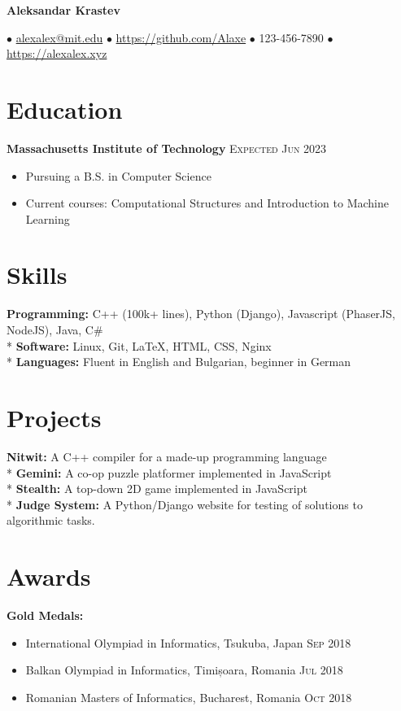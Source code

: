 \documentclass[letterpaper,11pt]{article}
\author{Aleksandar Krastev}
\date{2019-09-03}
\newcommand{\noskip}{\vspace{-\parskip}}
\begin{document}
\centerline{{\Huge \bf Aleksandar Krastev}}
$\bullet$ \href{mailto:alexalex@mit.edu}{alexalex@mit.edu} \hfill
$\bullet$ \href{https://github.com/Alaxe}{https://github.com/Alaxe} \hfill
$\bullet$ 123-456-7890 \hfill
$\bullet$ \href{https://alexalex.xyz}{https://alexalex.xyz}

\noskip
\section*{Education}
\textbf{Massachusetts Institute of Technology}
\hfill
\textsc{Expected Jun 2023}

\noskip
\begin{itemize}
    \item Pursuing a B.S. in Computer Science
    \item Current courses: Computational Structures and Introduction to Machine
        Learning
\end{itemize}

\section*{Skills}
\textbf{Programming:} C++ (100k+ lines), Python (Django), Javascript
    (PhaserJS, NodeJS), Java, C\#\\*
\textbf{Software:} Linux, Git, LaTeX, HTML, CSS, Nginx\\*
\textbf{Languages:} Fluent in English and Bulgarian, beginner in German

\section*{Projects}
\textbf{Nitwit:} A C++ compiler for a made-up programming language\\*
\textbf{Gemini:} A co-op puzzle platformer implemented in JavaScript\\*
\textbf{Stealth:} A top-down 2D game implemented in JavaScript\\*
\textbf{Judge System:} A Python/Django website for testing of solutions
to algorithmic tasks.

\section*{Awards}
\textbf{Gold Medals:}
\noskip
\begin{itemize}
    \item International Olympiad in Informatics, Tsukuba, Japan
        \hfill \textsc{Sep 2018}
    \item Balkan Olympiad in Informatics, Timișoara, Romania
        \hfill \textsc{Jul 2018}
    \item Romanian Masters of Informatics, Bucharest, Romania
        \hfill \textsc{Oct 2018}
\end{itemize}
\end{document}
